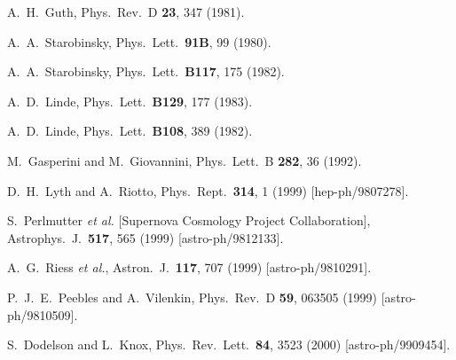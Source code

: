 \documentclass[prd,twocolumn,superscriptaddress]{revtex4}
\begin{document}
\begin{thebibliography}{99}
  A.~H.~Guth,
  Phys.\ Rev.\ D {\bf 23}, 347 (1981).
  
  A.~A.~Starobinsky,
  Phys.\ Lett.\  {\bf 91B}, 99 (1980).
  
  A.~A.~Starobinsky,
  Phys.\ Lett.\  {\bf B117}, 175 (1982).
  
  A.~D.~Linde,
  Phys.\ Lett.\  {\bf B129}, 177 (1983).
  
  A.~D.~Linde,
  Phys.\ Lett.\  {\bf B108}, 389 (1982).
  
  M.~Gasperini and M.~Giovannini,
  Phys.\ Lett.\ B {\bf 282}, 36 (1992).
  
  D.~H.~Lyth and A.~Riotto,
  Phys.\ Rept.\  {\bf 314}, 1 (1999)
  [hep-ph/9807278].
  
  S.~Perlmutter {\it et al.} [Supernova Cosmology Project Collaboration],
  Astrophys.\ J.\  {\bf 517}, 565 (1999)
  [astro-ph/9812133].
  
  A.~G.~Riess {\it et al.},
  Astron.\ J.\  {\bf 117}, 707 (1999)
  [astro-ph/9810291].
  
  P.~J.~E.~Peebles and A.~Vilenkin,
  Phys.\ Rev.\ D {\bf 59}, 063505 (1999)
  [astro-ph/9810509].
  
  S.~Dodelson and L.~Knox,
  Phys.\ Rev.\ Lett.\  {\bf 84}, 3523 (2000)
  [astro-ph/9909454].
  

\end{thebibliography}
\end{document}
